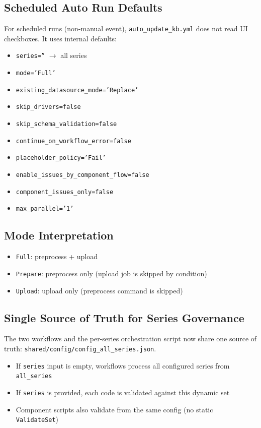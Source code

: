 \documentclass[11pt,a4paper]{article}
\begin{document}
\subsection{Scheduled Auto Run Defaults}
For scheduled runs (non-manual event), \texttt{auto\_update\_kb.yml} does not read UI checkboxes. It uses internal defaults:
\begin{itemize}
  \item \texttt{series=''} $\rightarrow$ all series
  \item \texttt{mode='Full'}
  \item \texttt{existing\_datasource\_mode='Replace'}
  \item \texttt{skip\_drivers=false}
  \item \texttt{skip\_schema\_validation=false}
  \item \texttt{continue\_on\_workflow\_error=false}
  \item \texttt{placeholder\_policy='Fail'}
  \item \texttt{enable\_issues\_by\_component\_flow=false}
  \item \texttt{component\_issues\_only=false}
  \item \texttt{max\_parallel='1'}
\end{itemize}

\subsection{Mode Interpretation}
\begin{itemize}
  \item \texttt{Full}: preprocess + upload
  \item \texttt{Prepare}: preprocess only (upload job is skipped by condition)
  \item \texttt{Upload}: upload only (preprocess command is skipped)
\end{itemize}

\subsection{Single Source of Truth for Series Governance}
The two workflows and the per-series orchestration script now share one source of truth:
\texttt{shared/config/config\_all\_series.json}.

\begin{itemize}
  \item If \texttt{series} input is empty, workflows process all configured series from \texttt{all\_series}
  \item If \texttt{series} is provided, each code is validated against this dynamic set
  \item Component scripts also validate from the same config (no static \texttt{ValidateSet})
\end{itemize}
\end{document}
